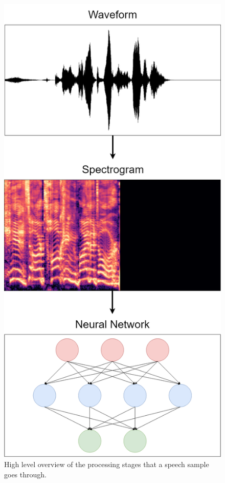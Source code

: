 \documentclass[conference]{IEEEtran}
\begin{document}
\begin{figure}[]
	\centering
	\hspace{6mm}
	\includegraphics[width=\linewidth]{high_level_dataflow_diagram.png}
	\caption{High level overview of the processing stages that a speech sample goes through.}
	\label{highLevelDataFlowDiagram}
\end{figure}
\end{document}
